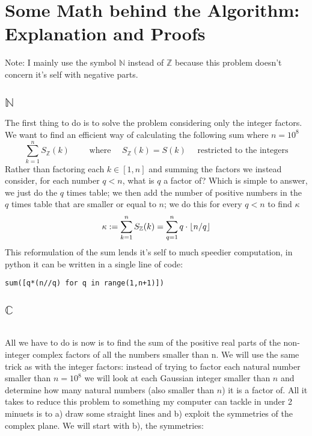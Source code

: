\documentclass[11pt]{article}
\newcommand{\N}{\mathbb{N}}
\newcommand{\Z}{\mathbb{Z}}
\newcommand{\C}{\mathbb{C}}
\DeclarePairedDelimiter\floor{\lfloor}{\rfloor}
\begin{document}
\section{Some Math behind the Algorithm: Explanation and Proofs}

Note: I mainly use the symbol $\N$ instead of $\Z$ because this problem doesn't concern it's self with negative parts.

\subsection{$\N$}
The first thing to do is to solve the problem considering only the integer factors. We want to find an efficient way of calculating the following sum where $n=10^8$
$$
\sum_{k=1}^{n}S_{\Z}(k) \quad\quad \text{ where } \quad S_{\Z}(k) = S(k) \quad \text{ restricted to the integers}
$$
Rather than factoring each $k \in [1,n]$ and summing the factors we instead consider, for each number $q < n$, what is $q$ a factor of? Which is simple to answer, we just do the $q$ times table; we then add the number of positive numbers in the $q$ times table that are smaller or equal to $n$; we do this for every $q < n$ to find $\kappa$
\begin{equation}\label{equation:natural sum}
\kappa := \sum_{k=1}^{n}S_{\Z}(k) = \sum_{q=1}^{n} q \cdot \floor*{n/q}
\end{equation}
This reformulation of the sum lends it's self to much speedier computation, in python it can be written in a single line of code:

\lstset{frame=none}
\begin{lstlisting}
sum([q*(n//q) for q in range(1,n+1)])
\end{lstlisting}

\subsection{$\C$}\\
All we have to do is now is to find the sum of the positive real parts of the non-integer complex factors of all the numbers smaller than n. We will use the same trick as with the integer factors: instead of trying to factor each natural number smaller than $n = 10^8$ we will look at each Gaussian integer smaller than $n$ and determine how many natural numbers (also smaller than $n$) it is a factor of. All it takes to reduce this problem to something my computer can tackle in under 2 minuets is to a) draw some straight lines and b) exploit the symmetries of the complex plane. We will start with b), the symmetries:
\end{document}
